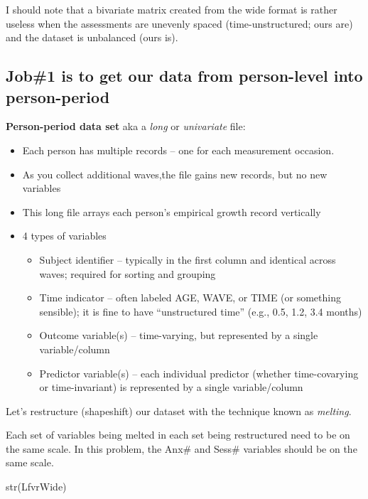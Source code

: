 \documentclass[
  english,
]{book}
\newenvironment{Shaded}{\begin{snugshade}}{\end{snugshade}}
\newcommand{\FunctionTok}[1]{\textcolor[rgb]{0.00,0.00,0.00}{#1}}
\newcommand{\NormalTok}[1]{#1}
\providecommand{\tightlist}{%
  \setlength{\itemsep}{0pt}\setlength{\parskip}{0pt}}
\begin{document}
I should note that a bivariate matrix created from the wide format is rather useless when the assessments are unevenly spaced (time-unstructured; ours are) and the dataset is unbalanced (ours is).

\hypertarget{job1-is-to-get-our-data-from-person-level-into-person-period}{%
\subsection{Job\#1 is to get our data from person-level into person-period}\label{job1-is-to-get-our-data-from-person-level-into-person-period}}

\textbf{Person-period data set} aka a \emph{long} or \emph{univariate} file:

\begin{itemize}
\tightlist
\item
  Each person has multiple records -- one for each measurement occasion.
\item
  As you collect additional waves,the file gains new records, but no new variables
\item
  This long file arrays each person's empirical growth record vertically
\item
  4 types of variables

  \begin{itemize}
  \tightlist
  \item
    Subject identifier -- typically in the first column and identical across waves; required for sorting and grouping
  \item
    Time indicator -- often labeled AGE, WAVE, or TIME (or something sensible); it is fine to have ``unstructured time'' (e.g., 0.5, 1.2, 3.4 months)
  \item
    Outcome variable(s) -- time-varying, but represented by a single variable/column
  \item
    Predictor variable(s) -- each individual predictor (whether time-covarying or time-invariant) is represented by a single variable/column
  \end{itemize}
\end{itemize}

Let's restructure (shapeshift) our dataset with the technique known as \emph{melting}.

Each set of variables being melted in each set being restructured need to be on the same scale. In this problem, the Anx\# and Sess\# variables should be on the same scale.

\begin{Shaded}
\begin{Highlighting}[]
\FunctionTok{str}\NormalTok{(LfvrWide)}
\end{Highlighting}
\end{Shaded}
\end{document}
